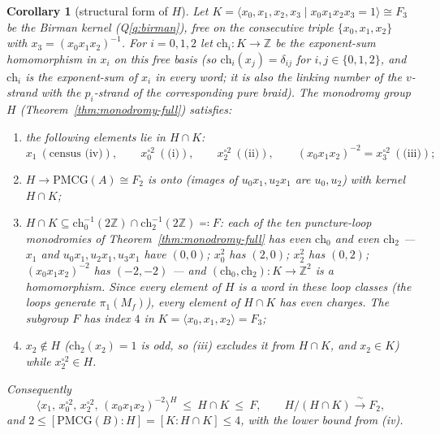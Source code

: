 \documentclass[11pt]{article}
\newtheorem{corollary}[theorem]{Corollary}
\theoremstyle{definition}
\theoremstyle{remark}
\newcommand{\PMCG}{\mathrm{PMCG}}
\begin{document}
\begin{corollary}[structural form of $H$]\label{cor:Hstruct}
Let $K=\langle x_0,x_1,x_2,x_3\mid x_0x_1x_2x_3=1\rangle\cong F_3$ be
the Birman kernel \textup{(}Q\ref{q:birman}\textup{)}, free on the
\emph{consecutive triple} $\{x_0,x_1,x_2\}$ with
$x_3=(x_0x_1x_2)^{-1}$.  For $i=0,1,2$ let
$\mathrm{ch}_i:K\to\mathbb Z$ be the exponent-sum homomorphism in
$x_i$ on this free basis \textup{(}so
$\mathrm{ch}_i(x_j)=\delta_{ij}$ for $i,j\in\{0,1,2\}$, and
$\mathrm{ch}_i$ is the exponent-sum of $x_i$ in every word; it is
also the linking number of the $v$-strand with the $p_i$-strand of the
corresponding pure braid\textup{)}.  The monodromy group $H$
\textup{(}Theorem~\ref{thm:monodromy-full}\textup{)} satisfies:
\begin{enumerate}[label=\textup{(}\roman*\textup{)}]
\item the following elements lie in $H\cap K$:
\[
x_1\ (\text{census (iv)}),\qquad
x_0^{\circ2}\ (\text{(i)}),\qquad
x_2^{\circ2}\ (\text{(ii)}),\qquad
(x_0x_1x_2)^{-2}=x_3^{\circ2}\ (\text{(iii)});
\]
\item $H\to\PMCG(A)\cong F_2$ is onto \textup{(}images of
$u_0x_1,u_2x_1$ are $u_0,u_2$\textup{)} with kernel $H\cap K$;
\item $H\cap K\subseteq
\mathrm{ch}_0^{-1}(2\mathbb Z)\cap\mathrm{ch}_2^{-1}(2\mathbb Z)
\eqqcolon F$: each of the ten puncture-loop monodromies of
Theorem~\ref{thm:monodromy-full} has even $\mathrm{ch}_0$ \emph{and}
even $\mathrm{ch}_2$ — $x_1$ and
$u_0x_1,u_2x_1,u_3x_1$ have $(0,0)$; $x_0^2$ has $(2,0)$; $x_2^2$ has
$(0,2)$; $(x_0x_1x_2)^{-2}$ has $(-2,-2)$ — and
$(\mathrm{ch}_0,\mathrm{ch}_2):K\to\mathbb Z^2$ is a homomorphism.
Since every element of $H$ is a word in these loop classes
\textup{(}the loops generate $\pi_1(M_f)$\textup{)}, every element of
$H\cap K$ has even charges.  The subgroup $F$ has index $4$ in
$K=\langle x_0,x_1,x_2\rangle=F_3$;
\item $x_2\notin H$ \textup{(}$\mathrm{ch}_2(x_2)=1$ is odd, so (iii)
excludes it from $H\cap K$, and $x_2\in K$\textup{)} while
$x_2^{\circ2}\in H$.
\end{enumerate}
Consequently
\[
\bigl\langle x_1,\,x_0^{\circ2},\,x_2^{\circ2},\,(x_0x_1x_2)^{-2}
\bigr\rangle^{H}\ \le\ H\cap K\ \le\ F,
\qquad
H/(H\cap K)\xrightarrow{\ \sim\ }F_2,
\]
and $2\le[\PMCG(B):H]=[K:H\cap K]\le 4$, with the lower bound from
\textup{(}iv\textup{)}.
\end{corollary}
\end{document}
